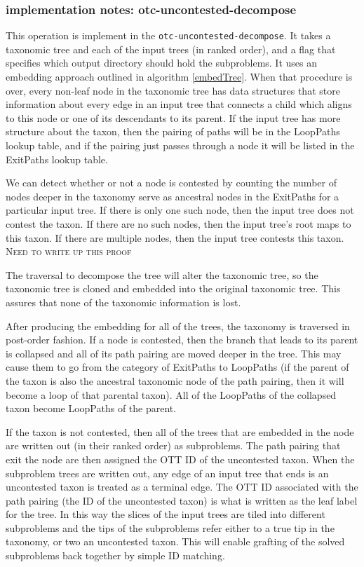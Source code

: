 \documentclass[11pt]{article}
\newcommand{\comment}[1]{{\color{red} \textsc{#1}}\xspace}
\newcommand{\ProofWriteupNeeded}{{\comment{Need to write up this proof}}}
\begin{document}
\subsubsection{implementation notes: otc-uncontested-decompose}
This operation is implement in the {\tt otc-uncontested-decompose}.
It takes a taxonomic tree and each of the input trees (in ranked order), and a flag
    that specifies which output directory should hold the subproblems.
It uses an embedding approach outlined in algorithm \ref{embedTree}.
When that procedure is over, every non-leaf node in the taxonomic tree
    has data structures that store information about every edge in 
    an input tree that connects a child which aligns to this node or one of its descendants
    to its parent.
If the input tree has more structure about the taxon, then the pairing of paths will be in the 
    LoopPaths lookup table, and if the pairing just passes through a node it will be listed in
    the ExitPaths lookup table.

We can detect whether or not a node is contested by counting the number of nodes deeper in the 
    taxonomy serve as ancestral nodes in the ExitPaths for a particular input tree.
If there is only one such node, then the input tree does not contest the taxon.
If there are no such nodes, then the input tree's root maps to this taxon.
If there are multiple nodes, then the input tree contests this taxon.
\ProofWriteupNeeded

The traversal to decompose the tree will alter the taxonomic tree, so the taxonomic tree 
     is cloned and embedded into the original taxonomic tree.
This assures that none of the taxonomic information is lost.

After producing the embedding for all of the trees, the taxonomy is traversed in post-order
    fashion.
If a node is contested, then the branch that leads to its parent is collapsed and
    all of its path pairing are moved deeper in the tree.
This may cause them to go from the category of ExitPaths to LoopPaths (if the parent of the
    taxon is also the ancestral taxonomic node of the path pairing, then it will become
    a loop of that parental taxon).
All of the LoopPaths of the collapsed taxon become LoopPaths of the parent.

If the taxon is not contested, then all of the trees that are embedded in the node
    are written out (in their ranked order) as subproblems.
The path pairing that exit the node are then assigned the OTT ID of the uncontested taxon.
When the subproblem trees are written out, any edge of an input tree that ends is an uncontested
    taxon is treated as a terminal edge.
The OTT ID associated with the path pairing (the ID of the uncontested taxon) is what is
    written as the leaf label for the tree.
In this way the slices of the input trees are tiled into different subproblems and the tips
    of the subproblems refer either to a true tip in the taxonomy, or two an uncontested taxon.
This will enable grafting of the solved subproblems back together by simple ID matching.
\end{document}
